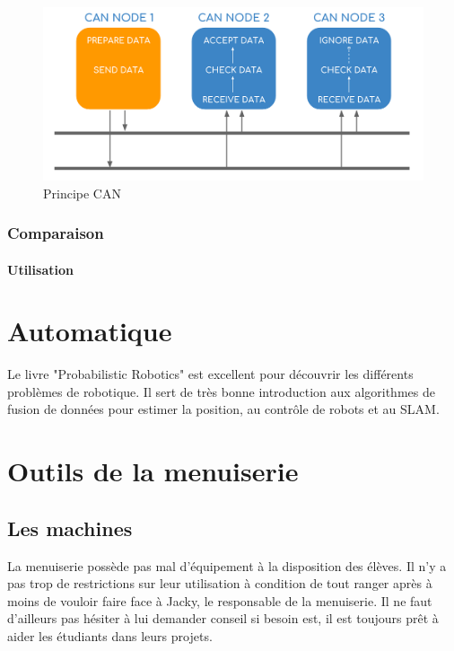 \documentclass[a4paper, 11pt]{report}
\begin{document}
\begin{figure}[h!]
	\begin{center}
		\includegraphics[scale=0.6]{images/principeCAN.png}
		\caption{Principe CAN}
	\end{center}
\end{figure}

\section{Comparaison}



\subsection{Utilisation}

\part{Automatique}

Le livre "Probabilistic Robotics" est excellent pour découvrir les différents problèmes de robotique. Il sert de très bonne introduction aux algorithmes de fusion de données pour estimer la position, au contrôle de robots et au SLAM.

\part{Outils de la menuiserie}

\chapter{Les machines}
La menuiserie possède pas mal d'équipement à la disposition des élèves. Il n'y a pas trop de restrictions sur leur utilisation à condition de tout ranger après à moins de vouloir faire face à Jacky, le responsable de la menuiserie. Il ne faut d'ailleurs pas hésiter à lui demander conseil si besoin est, il est toujours prêt à aider les étudiants dans leurs projets.
\end{document}
